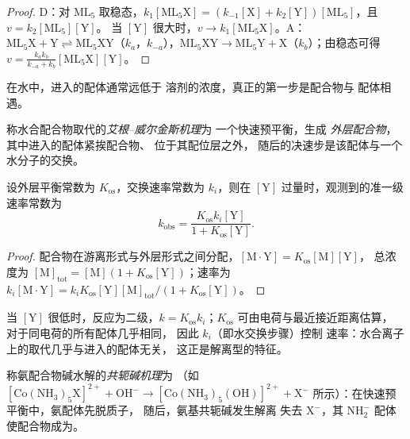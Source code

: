 \begin{proof}
D：对 $\mathrm{ML_5}$ 取稳态，$k_1[\mathrm{ML_5X}] = (k_{-1}[\mathrm X] + k_2[\mathrm Y])[\mathrm{ML_5}]$，且 $v = k_2[\mathrm{ML_5}][\mathrm Y]$。
当 $[\mathrm Y]$ 很大时，$v \to k_1[\mathrm{ML_5X}]$。A：$\mathrm{ML_5X} + \mathrm Y \rightleftharpoons \mathrm{ML_5XY}$（$k_a$，$k_{-a}$），$\mathrm{ML_5XY} \to
\mathrm{ML_5Y} + \mathrm X$（$k_b$）；由稳态可得 $v = \frac{k_ak_b}{k_{-a} + k_b}[\mathrm{ML_5X}][\mathrm Y]$。
\end{proof}

在水中，进入的配体通常远低于
溶剂的浓度，真正的第一步是配合物与
配体相遇。

\begin{definition}[艾根–威尔金斯机理]\label{def:b3:complex-mechanisms:eigen-wilkins}
称水合配合物取代的\emph{艾根–威尔金斯机理}为
一个快速预平衡，生成
\emph{外层配合物}，其中进入的配体紧挨配合物、
位于其配位层之外，
随后的决速步是该配体与一个水分子的交换。
\end{definition}

\begin{theorem}[艾根–威尔金斯速率方程]\label{thm:b3:complex-mechanisms:eigen-wilkins}
设外层平衡常数为 $K_{\mathrm{os}}$，交换速率常数为
$k_i$，则在 $[\mathrm Y]$ 过量时，观测到的准一级速率常数为
\[
  k_{\mathrm{obs}} = \frac{K_{\mathrm{os}}k_i[\mathrm Y]}{1 + K_{\mathrm{os}}[\mathrm Y]} .
\]
\end{theorem}

\begin{proof}
配合物在游离形式与外层形式之间分配，$[\mathrm{M\cdot Y}] = K_{\mathrm{os}}[\mathrm M][\mathrm Y]$，
总浓度为 $[\mathrm M]_{\mathrm{tot}} = [\mathrm M](1 + K_{\mathrm{os}}[\mathrm Y])$；速率为 $k_i[\mathrm{M\cdot Y}] = k_iK_{\mathrm{os}}[\mathrm Y][\mathrm M]_{\mathrm{tot}}/(1 + K_{\mathrm{os}}[\mathrm Y])$。
\end{proof}

当 $[\mathrm Y]$ 很低时，反应为二级，$k = K_{\mathrm{os}}k_i$；$K_{\mathrm{os}}$ 可由电荷与最近接近距离估算，
对于同电荷的所有配体几乎相同，
因此 $k_i$（即水交换步骤）控制
速率：水合离子上的取代几乎与进入的配体无关，
这正是解离型的特征。

\begin{definition}[共轭碱机理]\label{def:b3:complex-mechanisms:conjugate-base}
称氨配合物碱水解的\emph{共轭碱机理}为
（如 $\mathrm{[Co(NH_3)_5X]^{2+} + OH^- \to [Co(NH_3)_5(OH)]^{2+} + X^-}$ 所示）：在快速预平衡中，氨配体先脱质子，
随后，氨基共轭碱发生解离
失去 $\mathrm X^-$，其 $\mathrm{NH_2^-}$ 配体
使配合物成为。
\end{definition}

